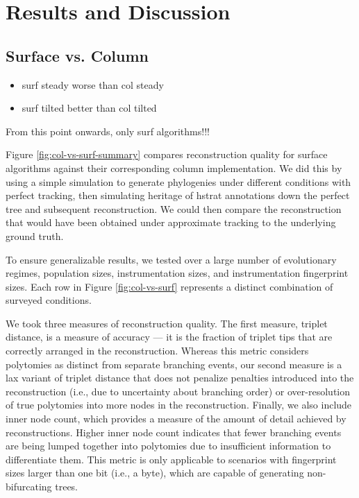 \section{Results and Discussion} \label{sec:results}





\subsection{Surface vs. Column} \label{sec:surface-vs-column}



\begin{itemize}
    \item surf steady worse than col steady
    \item surf tilted better than col tilted
\end{itemize}

From this point onwards, only surf algorithms!!!

Figure \ref{fig:col-vs-surf-summary} compares reconstruction quality for surface algorithms against their corresponding column implementation.
We did this by using a simple simulation to generate phylogenies under different conditions with perfect tracking, then simulating heritage of hstrat annotations down the perfect tree and subsequent reconstruction.
We could then compare the reconstruction that would have been obtained under approximate tracking to the underlying ground truth.

To ensure generalizable results, we tested over a large number of evolutionary regimes, population sizes, instrumentation sizes, and instrumentation fingerprint sizes.
Each row in Figure \ref{fig:col-vs-surf} represents a distinct combination of surveyed conditions.

We took three measures of reconstruction quality.
The first measure, triplet distance, is a measure of accuracy --- it is the fraction of triplet tips that are correctly arranged in the reconstruction.
Whereas this metric considers polytomies as distinct from separate branching events, our second measure is a lax variant of triplet distance that does not penalize penalties introduced into the reconstruction (i.e., due to uncertainty about branching order) or over-resolution of true polytomies into more nodes in the reconstruction.
Finally, we also include inner node count, which provides a measure of the amount of detail achieved by reconstructions.
Higher inner node count indicates that fewer branching events are being lumped together into polytomies due to insufficient information to differentiate them.
This metric is only applicable to scenarios with fingerprint sizes larger than one bit (i.e., a byte), which are capable of generating non-bifurcating trees.


